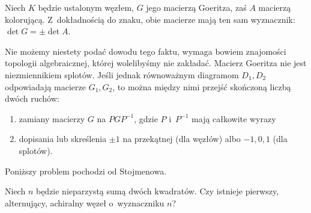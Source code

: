 \begin{proposition}
    Niech $K$ będzie ustalonym węzłem, $G$ jego macierzą Goeritza, zaś $A$ macierzą kolorującą.
    Z~dokładnością do znaku, obie macierze mają ten sam wyznacznik: $\det G = \pm \det A$.
\end{proposition}

Nie możemy niestety podać dowodu tego faktu, wymaga bowiem znajomości topologii algebraicznej, której wolelibyśmy nie zakładać.
Macierz Goeritza nie jest niezmiennikiem splotów.
Jeśli jednak równoważnym diagramom $D_1, D_2$ odpowiadają macierze $G_1, G_2$, to można między nimi przejść skończoną liczbą dwóch ruchów:
\begin{enumerate}[leftmargin=*]
\itemsep0em
    \item zamiany macierzy $G$ na $PGP^{-1}$, gdzie $P$ i~$P^{-1}$ mają całkowite wyrazy
    \item dopisania lub skreślenia $\pm 1$ na przekątnej (dla węzłów) albo $-1, 0, 1$ (dla splotów).
\end{enumerate}




Poniższy problem pochodzi od Stojmenowa.

\begin{conjecture}
    Niech $n$ będzie nieparzystą sumą dwóch kwadratów.
    Czy istnieje pierwszy, alternujący, achiralny węzeł o~wyznaczniku $n$?
\end{conjecture}

